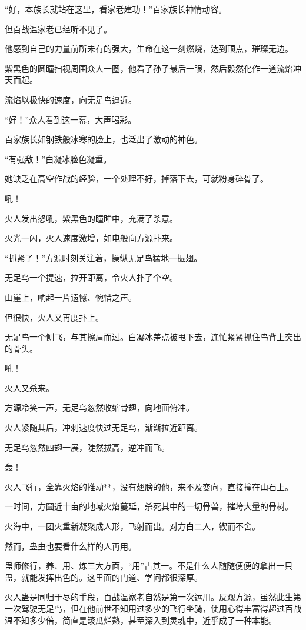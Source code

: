 \begin{this_body}
“好，本族长就站在这里，看家老建功！”百家族长神情动容。

但百战温家老已经听不见了。

他感到自己的力量前所未有的强大，生命在这一刻燃烧，达到顶点，璀璨无边。

紫黑色的圆瞳扫视周围众人一圈，他看了孙子最后一眼，然后毅然化作一道流焰冲天而起。

流焰以极快的速度，向无足鸟逼近。

“好！”众人看到这一幕，大声喝彩。

百家族长如钢铁般冰寒的脸上，也泛出了激动的神色。

“有强敌！”白凝冰脸色凝重。

她缺乏在高空作战的经验，一个处理不好，掉落下去，可就粉身碎骨了。

吼！

火人发出怒吼，紫黑色的瞳眸中，充满了杀意。

火光一闪，火人速度激增，如电般向方源扑来。

“抓紧了！”方源时刻关注着，操纵无足鸟猛地一振翅。

无足鸟一个提速，拉开距离，令火人扑了个空。

山崖上，响起一片遗憾、惋惜之声。

但很快，火人又再度扑上。

无足鸟一个侧飞，与其擦肩而过。白凝冰差点被甩下去，连忙紧紧抓住鸟背上突出的骨头。

吼！

火人又杀来。

方源冷笑一声，无足鸟忽然收缩骨翅，向地面俯冲。

火人紧随其后，冲刺速度快过无足鸟，渐渐拉近距离。

无足鸟忽然四翅一展，陡然拔高，逆冲而飞。

轰！

火人飞行，全靠火焰的推动**，没有翅膀的他，来不及变向，直接撞在山石上。

一时间，方圆近十亩的地域火焰蔓延，杀死其中的一切骨兽，摧垮大量的骨树。

火海中，一团火重新凝聚成人形，飞射而出。对方白二人，锲而不舍。

然而，蛊虫也要看什么样的人再用。

蛊师修行，养、用、炼三大方面，“用”占其一。不是什么人随随便便的拿出一只蛊，就能发挥出色的。这里面的门道、学问都很深厚。

火人蛊是同归于尽的手段，百战温家老自然是第一次运用。反观方源，虽然此生第一次驾驶无足鸟，但在他前世不知用过多少的飞行坐骑，使用心得丰富得超过百战温不知多少倍，简直是滚瓜烂熟，甚至深入到灵魂中，近乎成了一种本能。


\end{this_body}
